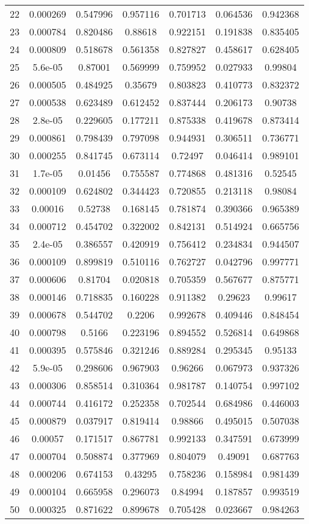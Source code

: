 \begin{table}
\begin{tabular}{c|c|c|c|c|c|c}
22 & 0.000269 & 0.547996 & 0.957116 & 0.701713 & 0.064536 & 0.942368\\
23 & 0.000784 & 0.820486 & 0.88618 & 0.922151 & 0.191838 & 0.835405\\
24 & 0.000809 & 0.518678 & 0.561358 & 0.827827 & 0.458617 & 0.628405\\
25 & 5.6e-05 & 0.87001 & 0.569999 & 0.759952 & 0.027933 & 0.99804\\
26 & 0.000505 & 0.484925 & 0.35679 & 0.803823 & 0.410773 & 0.832372\\
27 & 0.000538 & 0.623489 & 0.612452 & 0.837444 & 0.206173 & 0.90738\\
28 & 2.8e-05 & 0.229605 & 0.177211 & 0.875338 & 0.419678 & 0.873414\\
29 & 0.000861 & 0.798439 & 0.797098 & 0.944931 & 0.306511 & 0.736771\\
30 & 0.000255 & 0.841745 & 0.673114 & 0.72497 & 0.046414 & 0.989101\\
31 & 1.7e-05 & 0.01456 & 0.755587 & 0.774868 & 0.481316 & 0.52545\\
32 & 0.000109 & 0.624802 & 0.344423 & 0.720855 & 0.213118 & 0.98084\\
33 & 0.00016 & 0.52738 & 0.168145 & 0.781874 & 0.390366 & 0.965389\\
34 & 0.000712 & 0.454702 & 0.322002 & 0.842131 & 0.514924 & 0.665756\\
35 & 2.4e-05 & 0.386557 & 0.420919 & 0.756412 & 0.234834 & 0.944507\\
36 & 0.000109 & 0.899819 & 0.510116 & 0.762727 & 0.042796 & 0.997771\\
37 & 0.000606 & 0.81704 & 0.020818 & 0.705359 & 0.567677 & 0.875771\\
38 & 0.000146 & 0.718835 & 0.160228 & 0.911382 & 0.29623 & 0.99617\\
39 & 0.000678 & 0.544702 & 0.2206 & 0.992678 & 0.409446 & 0.848454\\
40 & 0.000798 & 0.5166 & 0.223196 & 0.894552 & 0.526814 & 0.649868\\
41 & 0.000395 & 0.575846 & 0.321246 & 0.889284 & 0.295345 & 0.95133\\
42 & 5.9e-05 & 0.298606 & 0.967903 & 0.96266 & 0.067973 & 0.937326\\
43 & 0.000306 & 0.858514 & 0.310364 & 0.981787 & 0.140754 & 0.997102\\
44 & 0.000744 & 0.416172 & 0.252358 & 0.702544 & 0.684986 & 0.446003\\
45 & 0.000879 & 0.037917 & 0.819414 & 0.98866 & 0.495015 & 0.507038\\
46 & 0.00057 & 0.171517 & 0.867781 & 0.992133 & 0.347591 & 0.673999\\
47 & 0.000704 & 0.508874 & 0.377969 & 0.804079 & 0.49091 & 0.687763\\
48 & 0.000206 & 0.674153 & 0.43295 & 0.758236 & 0.158984 & 0.981439\\
49 & 0.000104 & 0.665958 & 0.296073 & 0.84994 & 0.187857 & 0.993519\\
50 & 0.000325 & 0.871622 & 0.899678 & 0.705428 & 0.023667 & 0.984263\\
\end{tabular}
\end{table}
